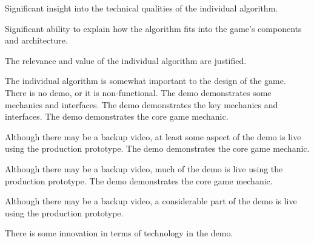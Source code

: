 \documentclass{../fal_assignment}
\begin{document}
\begin{markingrubric}
        \grade Significant insight into the technical qualities of the individual algorithm.
            \par Significant ability to explain how the algorithm fits into the game's components and architecture.
            \par The relevance and value of the  individual algorithm are justified.
            \par The  individual algorithm is somewhat important to the design of the game.
%
        \grade\fail There is no demo, or it is non-functional.
        \grade The demo demonstrates some mechanics and interfaces.
        \grade The demo demonstrates the key mechanics and interfaces.
        \grade The demo demonstrates the core game mechanic.
            \par Although there may be a backup video, at least some aspect of the demo is live using the production prototype.
        \grade The demo demonstrates the core game mechanic.
            \par Although there may be a backup video, much of the demo is live using the production prototype.
        \grade The demo demonstrates the core game mechanic.
            \par Although there may be a backup video, a considerable part of the demo is live using the production prototype.
            \par There is some innovation in terms of technology in the demo.
\end{markingrubric}
\end{document}

